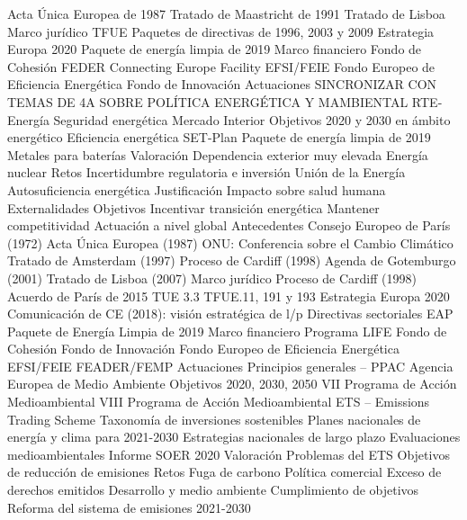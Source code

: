 \documentclass{nuevotema}
\begin{document}
\begin{esquema}[enumerate]
			\3 Acta Única Europea de 1987
			\3 Tratado de Maastricht de 1991
			\3 Tratado de Lisboa
		\2 Marco jurídico
			\3 TFUE
			\3 Paquetes de directivas de 1996, 2003 y 2009
			\3 Estrategia Europa 2020
			\3 Paquete de energía limpia de 2019
		\2 Marco financiero
			\3 Fondo de Cohesión
			\3 FEDER
			\3 Connecting Europe Facility
			\3 EFSI/FEIE
			\3 Fondo Europeo de Eficiencia Energética
			\3 Fondo de Innovación
		\2 Actuaciones
			\3 SINCRONIZAR CON TEMAS DE 4A SOBRE POLÍTICA ENERGÉTICA Y MAMBIENTAL
			\3 RTE-Energía
			\3 Seguridad energética
			\3 Mercado Interior
			\3 Objetivos 2020 y 2030 en ámbito energético
			\3 Eficiencia energética
			\3 SET-Plan
			\3 Paquete de energía limpia de 2019
			\3 Metales para baterías
		\2 Valoración
			\3 Dependencia exterior muy elevada
			\3 Energía nuclear
		\2 Retos
			\3 Incertidumbre regulatoria e inversión
			\3 Unión de la Energía
			\3 Autosuficiencia energética
	\1 
		\2 Justificación
			\3 Impacto sobre salud humana
			\3 Externalidades
		\2 Objetivos
			\3 Incentivar transición energética
			\3 Mantener competitividad
			\3 Actuación a nivel global
		\2 Antecedentes
			\3 Consejo Europeo de París (1972)
			\3 Acta Única Europea (1987)
			\3 ONU: Conferencia sobre el Cambio Climático
			\3 Tratado de Amsterdam (1997)
			\3 Proceso de Cardiff (1998)
			\3 Agenda de Gotemburgo (2001)
			\3 Tratado de Lisboa (2007)
		\2 Marco jurídico
			\3 Proceso de Cardiff (1998)
			\3 Acuerdo de París de 2015
			\3 TUE 3.3
			\3 TFUE.11, 191 y 193
			\3 Estrategia Europa 2020
			\3 Comunicación de CE (2018): visión estratégica de l/p
			\3 Directivas sectoriales
			\3 EAP
			\3 Paquete de Energía Limpia de 2019
		\2 Marco financiero
			\3 Programa LIFE
			\3 Fondo de Cohesión
			\3 Fondo de Innovación
			\3 Fondo Europeo de Eficiencia Energética
			\3 EFSI/FEIE
			\3 FEADER/FEMP
		\2 Actuaciones
			\3 Principios generales -- PPAC
			\3 Agencia Europea de Medio Ambiente
			\3 Objetivos 2020, 2030, 2050
			\3 VII Programa de Acción Medioambiental
			\3 VIII Programa de Acción Medioambiental
			\3 ETS -- Emissions Trading Scheme
			\3 Taxonomía de inversiones sostenibles
			\3 Planes nacionales de energía y clima para 2021-2030
			\3 Estrategias nacionales de largo plazo
			\3 Evaluaciones medioambientales
			\3 Informe SOER 2020
		\2 Valoración
			\3 Problemas del ETS
			\3 Objetivos de reducción de emisiones
		\2 Retos
			\3 Fuga de carbono
			\3 Política comercial
			\3 Exceso de derechos emitidos
			\3 Desarrollo y medio ambiente
			\3 Cumplimiento de objetivos
			\3 Reforma del sistema de emisiones 2021-2030

\end{esquema}
\end{document}
